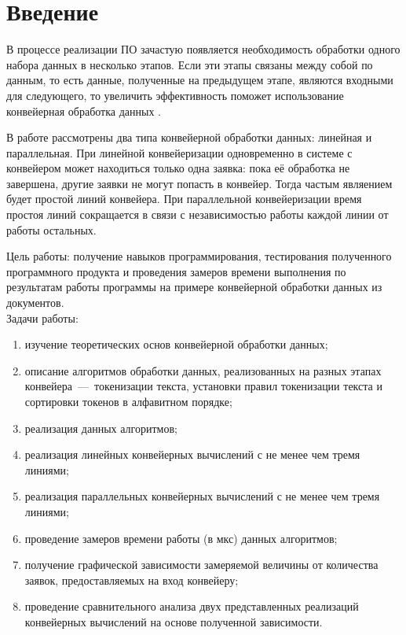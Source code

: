 \setcounter{page}{3}
\chapter*{Введение}
В процессе реализации ПО зачастую появляется необходимость обработки одного набора данных в несколько этапов. Если эти этапы связаны между собой по данным, то есть данные, полученные на предыдущем этапе, являются входными для следующего, то увеличить эффективность поможет использование конвейерная обработка данных \cite{item13}. 

В работе рассмотрены два типа конвейерной обработки данных: линейная и параллельная. При линейной конвейеризации одновременно в системе с конвейером может находиться только одна заявка: пока её обработка не завершена, другие заявки не могут попасть в конвейер. Тогда частым являением будет простой линий конвейера. При параллельной конвейеризации время простоя линий сокращается в связи с независимостью работы каждой линии от работы остальных.

Цель работы: получение навыков программирования, тестирования полученного программного продукта и проведения замеров времени выполнения по результатам работы программы на примере конвейерной обработки данных из документов.\\

Задачи работы:
\begin{enumerate}[label={\arabic*)}]
	\item изучение теоретических основ конвейерной обработки данных;
	\item описание алгоритмов обработки данных, реализованных на разных этапах конвейера~---~токенизации текста, установки правил токенизации текста и сортировки токенов в алфавитном порядке;
	\item реализация данных алгоритмов;
	\item реализация линейных конвейерных вычислений с не менее чем тремя линиями;
	\item реализация параллельных конвейерных вычислений с не менее чем тремя линиями;
	\item проведение замеров времени работы (в мкс) данных алгоритмов; 
	\item получение графической зависимости замеряемой величины от количества заявок, предоставляемых на вход конвейеру;
	\item проведение сравнительного анализа двух представленных реализаций конвейерных вычислений на основе полученной зависимости.
\end{enumerate}

\newpage